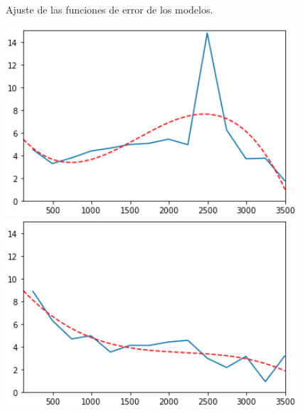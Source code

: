 \begin{figure}[H]
\begin{minipage}{0.32\textwidth}
	\end{minipage}
	\caption{Ajuste de las funciones de error de los modelos.}
	\label{fig:Ajuste de las funciones de error de los modelos.}
\end{figure}

\begin{figure}[H]
	\begin{minipage}{0.32\textwidth}
		\centering
		\includegraphics[width=1\linewidth]{Book/figures/6_approx_distancia/ensemble_not_overfitting_0.png}
	\end{minipage}\hfill
	\begin{minipage}{0.32\textwidth}
		\centering
		\includegraphics[width=1\linewidth]{Book/figures/6_approx_distancia/ensemble_not_overfitting_1.png}
	\end{minipage}\hfill
	\begin{minipage}{0.32\textwidth}
		\centering

\end{minipage}
\end{figure}
